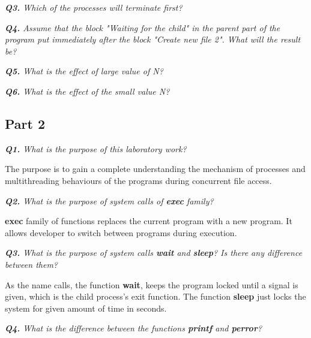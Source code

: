 \documentclass[11pt]{article}
\begin{document}
\vspace{5mm}
\textit{\textbf{Q3.} Which of the processes will terminate first?}
\vspace{5mm}

\vspace{5mm}
\textit{\textbf{Q4.} Assume that the block "Waiting for the child" in the parent part of the program put immediately after the block "Create new file 2". What will the result be?}
\vspace{5mm}

\vspace{5mm}
\textit{\textbf{Q5.} What is the effect of large value of N?}
\vspace{5mm}

\vspace{5mm}
\textit{\textbf{Q6.} What is the effect of the small value N?}
\vspace{5mm}

\subsection*{Part 2}

\textit{\textbf{Q1.} What is the purpose of this laboratory work?}
\vspace{3mm}

The purpose is to gain a complete understanding the mechanism of processes and multithreading behaviours of the programs during concurrent file access.

\vspace{3mm}
\textit{\textbf{Q2.} What is the purpose of system calls of \textbf{exec} family?}
\vspace{3mm}

\textbf{exec} family of functions replaces the current program with a new program. It allows developer to switch between programs during execution.

\vspace{5mm}
\textit{\textbf{Q3.} What is the purpose of system calls \textbf{wait} and \textbf{sleep}? Is there any difference between them?}
\vspace{5mm}

As the name calls, the function \textbf{wait}, keeps the program locked until a signal is given, which is the child process's exit function. The function \textbf{sleep} just locks the system for given amount of time in seconds.

\vspace{5mm}
\textit{\textbf{Q4.} What is the difference between the functions \textbf{printf} and \textbf{perror}?}
\vspace{5mm}
\end{document}
